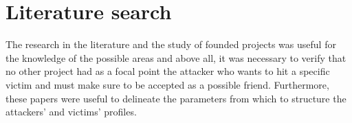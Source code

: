 

\chapter{Literature search}
\label{cap:literature-search}
The research in the literature and the study of founded projects was useful for the knowledge of the possible areas and above all, it was necessary to verify that no other project had as a focal point the attacker who wants to hit a specific victim and must make sure to be accepted as a possible friend. Furthermore, these papers were useful to delineate the parameters from which to structure the attackers' and victims' profiles.

